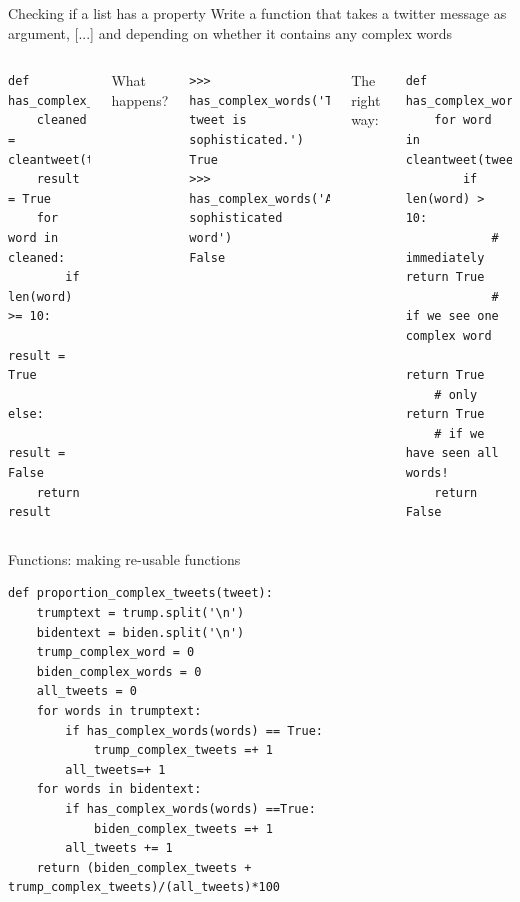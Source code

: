 \documentclass[aspectratio=169,usenames,dvipsnames]{beamer}
\begin{document}
\begin{frame}[fragile]{Checking if a list has a property}
Write a function that takes a twitter message as argument, [...]
and  depending on whether it
contains any complex words

\begin{columns}[T]
\begin{lstlisting}[style=smaller]
def has_complex_words(tweet):
    cleaned = cleantweet(tweet)
    result = True
    for word in cleaned:
        if len(word) >= 10:
            result = True
        else:
            result = False
    return result
\end{lstlisting}
What happens?
\pause
\begin{lstlisting}[style=smaller]
>>> has_complex_words('This tweet is sophisticated.')
True
>>> has_complex_words('A sophisticated word')
False
\end{lstlisting}
\pause{}
The right way:
\begin{lstlisting}[style=smaller]
def has_complex_words(tweet):
    for word in cleantweet(tweet)
        if len(word) > 10:
            # immediately return True
            # if we see one complex word
            return True
    # only return True
    # if we have seen all words!
    return False
\end{lstlisting}
\end{columns}
\end{frame}


\begin{frame}[fragile]{Functions: making re-usable functions}
\begin{lstlisting}[style=smaller]
def proportion_complex_tweets(tweet):
    trumptext = trump.split('\n')
    bidentext = biden.split('\n') 
    trump_complex_word = 0
    biden_complex_words = 0
    all_tweets = 0
    for words in trumptext: 
        if has_complex_words(words) == True: 
            trump_complex_tweets =+ 1
        all_tweets=+ 1  
    for words in bidentext: 
        if has_complex_words(words) ==True: 
            biden_complex_tweets =+ 1
        all_tweets += 1   
    return (biden_complex_tweets + trump_complex_tweets)/(all_tweets)*100
\end{lstlisting}
\end{frame}
\end{document}

